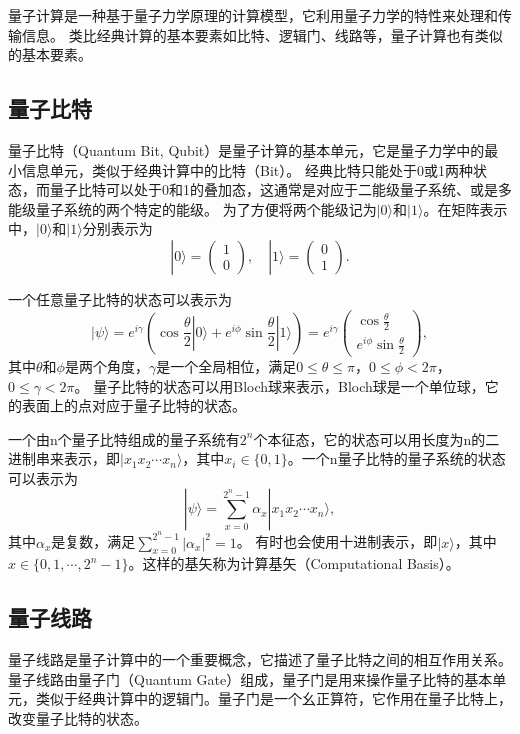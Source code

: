 量子计算是一种基于量子力学原理的计算模型，它利用量子力学的特性来处理和传输信息。
类比经典计算的基本要素如比特、逻辑门、线路等，量子计算也有类似的基本要素。

\subsection{量子比特}
量子比特（Quantum Bit, Qubit）是量子计算的基本单元，它是量子力学中的最小信息单元，类似于经典计算中的比特（Bit）。
经典比特只能处于0或1两种状态，而量子比特可以处于0和1的叠加态，这通常是对应于二能级量子系统、或是多能级量子系统的两个特定的能级。
为了方便将两个能级记为$|0\rangle$和$|1\rangle$。在矩阵表示中，$|0\rangle$和$|1\rangle$分别表示为
\begin{equation}
    |0\rangle = \begin{pmatrix} 1 \\ 0 \end{pmatrix}, \quad |1\rangle = \begin{pmatrix} 0 \\ 1 \end{pmatrix}.
\end{equation}

一个任意量子比特的状态可以表示为
\begin{equation}
    |\psi\rangle = e^{i\gamma}(\cos\frac{\theta}{2}|0\rangle + e^{i\phi}\sin\frac{\theta}{2}|1\rangle)=e^{i\gamma}\begin{pmatrix}
        \cos\frac{\theta}{2} \\ e^{i\phi}\sin\frac{\theta}{2}
    \end{pmatrix},
\end{equation}
其中$\theta$和$\phi$是两个角度，$\gamma$是一个全局相位，满足$0 \leq \theta \leq \pi$，$0 \leq \phi < 2\pi$，$0 \leq \gamma < 2\pi$。 量子比特的状态可以用Bloch球来表示，Bloch球是一个单位球，它的表面上的点对应于量子比特的状态。

一个由n个量子比特组成的量子系统有$2^n$个本征态，它的状态可以用长度为n的二进制串来表示，即$|x_1x_2\cdots x_n\rangle$，其中$x_i \in \{0, 1\}$。一个n量子比特的量子系统的状态可以表示为
\begin{equation}
    |\psi\rangle = \sum_{x=0}^{2^n-1} \alpha_x |x_1x_2\cdots x_n\rangle,
\end{equation}
其中$\alpha_x$是复数，满足$\sum_{x=0}^{2^n-1} |\alpha_x|^2 = 1$。
有时也会使用十进制表示，即$|x\rangle$，其中$x \in \{0, 1, \cdots, 2^n-1\}$。这样的基矢称为计算基矢（Computational Basis）。

\subsection{量子线路}
量子线路是量子计算中的一个重要概念，它描述了量子比特之间的相互作用关系。量子线路由量子门（Quantum Gate）组成，量子门是用来操作量子比特的基本单元，类似于经典计算中的逻辑门。量子门是一个幺正算符，它作用在量子比特上，改变量子比特的状态。

